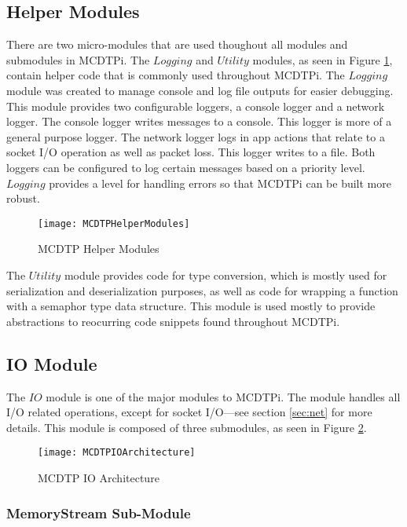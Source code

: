 \subsection{Helper Modules}

There are two micro-modules that are used thoughout all modules and submodules in MCDTPi. The $Logging$ and $Utility$ modules, as seen in Figure \ref{fig:mcdtp-hm}, contain helper code that is commonly used throughout MCDTPi. The $Logging$ module was created to manage console and log file outputs for easier debugging. This module provides two configurable loggers, a console logger and a network logger. The console logger writes messages to a console. This logger is more of a general purpose logger. The network logger logs in app actions that relate to a socket I/O operation as well as packet loss. This logger writes to a file. Both loggers can be configured to log certain messages based on a priority level. $Logging$ provides a level for handling errors so that MCDTPi can be built more robust.

\begin{figure}[ht]
\centering
\texttt{[image: MCDTPHelperModules]}
\caption{MCDTP Helper Modules}
\label{fig:mcdtp-hm}
\end{figure}

The $Utility$ module provides code for type conversion, which is mostly used for serialization and deserialization purposes, as well as code for wrapping a function with a semaphor type data structure. This module is used mostly to provide abstractions to reocurring code snippets found throughout MCDTPi.

\subsection{IO Module}

The $IO$ module is one of the major modules to MCDTPi. The module handles all I/O related operations, except for socket I/O---see section \ref{sec:net} for more details. This module is composed of three submodules, as seen in Figure \ref{fig:mcdtp-io-arch}.

\begin{figure}[ht]
\centering
\texttt{[image: MCDTPIOArchitecture]}
\caption{MCDTP IO Architecture}
\label{fig:mcdtp-io-arch}
\end{figure}

\subsubsection{MemoryStream Sub-Module}

